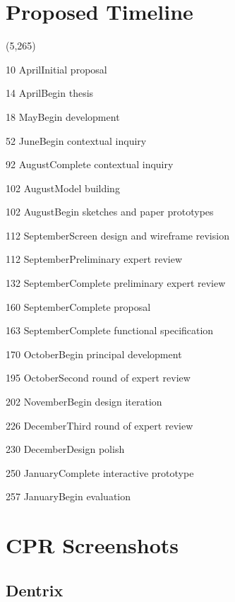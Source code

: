 \documentclass[11pt]{article}
\begin{document}
\newpage

\section{Proposed Timeline}



\begin{timeline}{4.2in}(5,265)
\optrule
  \item[10]{April}{Initial proposal}
  \item[14]{April}{Begin thesis}
  \item[18]{May}{Begin development}
  \item[52]{June}{Begin contextual inquiry}
  \item[92]{August}{Complete contextual inquiry}
  \item[102]{August}{Model building}
  \item[102]{August}{Begin sketches and paper prototypes}
  \item[112]{September}{Screen design and wireframe revision}
  \item[112]{September}{Preliminary expert review}
  \item[132]{September}{Complete preliminary expert review}
  \item[160]{September}{Complete proposal}
  \item[163]{September}{Complete functional specification}
  \item[170]{October}{Begin principal development}
  \item[195]{October}{Second round of expert review}
  \item[202]{November}{Begin design iteration}
  \item[226]{December}{Third round of expert review}
  \item[230]{December}{Design polish}
  \item[250]{January}{Complete interactive prototype}
  \item[257]{January}{Begin evaluation}
\end{timeline}%
\newpage

\footnotesize{
}
\newpage

\appendix
\renewcommand\thesection{Appendix \Alph{section}}

\section{CPR Screenshots}
\label{SS}
\subsection{Dentrix}
\label{dentrixplain}
\end{document}

